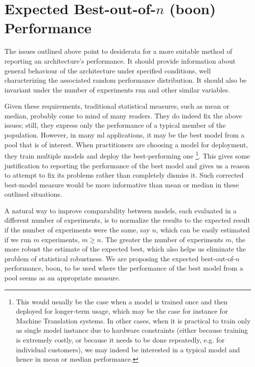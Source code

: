 \documentclass{article}
\newcommand{\ml}{\gls{ml}\xspace}
\newcommand{\tboon}{\gls{boon}\xspace}
\begin{document}
\section{Expected Best-out-of-$n$ (\tboon) Performance}
\label{sec:expMax}


The issues outlined above point to desiderata for a more suitable method of reporting an architecture's performance. It should provide information about general behaviour of the architecture under specified conditions, well characterizing the associated random performance distribution. It should also be invariant under the number of experiments run and other similar variables. 

Given these requirements, traditional statistical measures, such as mean or median, probably come to mind of many readers. They do indeed fix the above issues; still, they express only the performance of a typical member of the population. However, in many \ml applications, it may be the best model from a pool that is of interest. When practitioners are choosing a model for deployment, they train multiple models and deploy the best-performing one
\footnote{This would usually be the case when a model is trained once and then deployed for longer-term usage, which may be the case for instance for Machine Translation systems. In other cases, when it is practical to train only as single model instance due to hardware constraints (either because training is extremely costly, or because it needs to be done repeatedly, e.g. for individual customers), we may indeed be interested in a typical model and hence in mean or median performance.}.
This gives some justification to reporting the performance of the best model and gives us a reason to attempt to fix its problems rather than completely dismiss it. Such corrected best-model measure would be more informative than mean or median in these outlined situations.


A natural way to improve comparability between models, each evaluated in a different number of experiments, is to normalize the results to the expected result if the number of experiments were the same, say $n$, which can be easily estimated if we run $m$ experiments, $m\geq n$. The greater the number of experiments $m$, the more robust the estimate of the expected best, which also helps us eliminate the problem of statistical robustness. We are proposing the expected best-out-of-$n$ performance, \tboon, to be used where the performance of the best model from a pool seems as an appropriate measure. 
\end{document}
